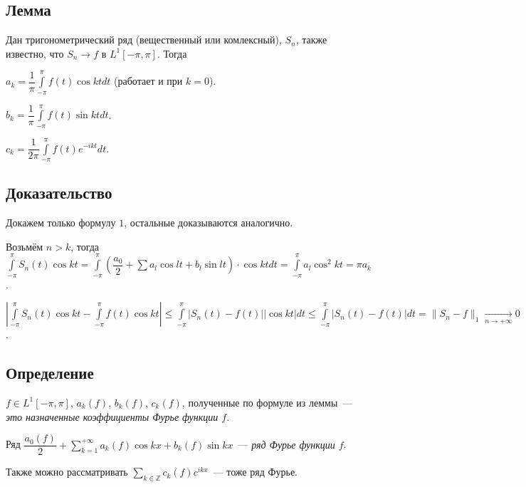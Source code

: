 \documentclass{article}
\begin{document}
    \subsection{Лемма}
    
        Дан тригонометрический ряд (вещественный или комлексный), $S_n$, также известно, что $S_n \rightarrow f$ в $L^1 [-\pi, \pi]$. Тогда
        
        $a_k = \dfrac{1}{\pi} \int\limits^{\pi}_{-\pi} f(t) \cos kt dt$ (работает и при $k = 0$).
        
        $b_k = \dfrac{1}{\pi} \int\limits^{\pi}_{-\pi} f(t) \sin kt dt$.
        
        $c_k = \dfrac{1}{2 \pi} \int\limits^{\pi}_{-\pi} f(t) e^{-ikt} dt$.

        \subsection{Доказательство}
        
            Докажем только формулу $1$, остальные доказываются аналогично.
            
            Возьмём $n > k$, тогда $\int\limits_{-\pi}^{\pi} S_n(t) \cos {kt} = \int\limits^{\pi}_{-\pi} \left( \dfrac{a_0}{2} + \sum a_l \cos {lt} + b_l \sin {lt} \right) \cdot \cos {kt} dt = \int\limits^{\pi}_{-\pi} a_l \cos^2 {kt} = \pi a_k$.
            
            $\left| \int\limits^{\pi}_{-\pi} S_n(t) \cos {kt} - \int\limits^{\pi}_{-\pi} f(t) \cos {kt} \right| \leqslant \int\limits^{\pi}_{-\pi} \left| S_n(t) - f(t) \right| \left| \cos {kt} \right| dt \leqslant \int\limits^{\pi}_{-\pi} \left| S_n(t) - f(t) \right| dt = \| S_n - f \|_1 \xrightarrow[n \rightarrow +\infty]{} 0$.
            
    \subsection{Определение}
    
        $f \in L^1 [-\pi, \pi]$, $a_k(f)$, $b_k(f)$, $c_k(f)$, полученные по формуле из леммы~--- \textit{это назначенные коэффициенты Фурье функции $f$}.
        
        Ряд $\dfrac{a_0(f)}{2} + \sum\limits_{k = 1}^{+\infty} a_k(f) \cos {kx} + b_k(f) \sin {kx}$~--- \textit{ряд Фурье функции $f$}.
        
        Также можно рассматривать $\sum\limits_{k \in \mathbb{Z}} c_k(f) c^{ikx}$~--- тоже ряд Фурье.
        
\end{document}
